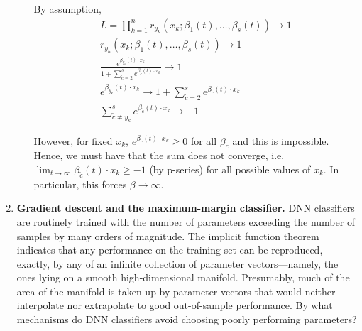 \documentclass[11pt]{report}
\begin{document}
\begin{enumerate}[1.]
\begin{enumerate}[(a)]
		            \color{blue}
		            By assumption,
		            \begin{gather*}
			            L = \prod_{k=1}^n r_{y_k}(x_k; \beta_1(t), \dots, \beta_s(t))  \to 1                                                                          \\
			            r_{y_k}(x_k; \beta_1(t), \dots, \beta_s(t))                    \to 1                                                                          \\
			            \frac{e^{\beta_{y_k}(t) \cdot x_k}}{1 + \sum_{\tilde{c} = 2}^s e^{\beta_{\tilde c}(t) \cdot x_k}} \to 1 \\
			            e^{\beta_{y_k}(t) \cdot x_k} \to 1 + \sum_{\tilde{c} = 2}^s e^{\beta_{\tilde c}(t) \cdot x_k}\\
			            \sum_{\tilde{c} \neq y_k}^s e^{\beta_{\tilde c}(t) \cdot x_k} \to -1
		            \end{gather*}

		            However, for fixed $x_k$, $e^{\beta_{\tilde c}(t) \cdot x_k} \geq 0$ for all $\beta_c$ and this is impossible. Hence, we must have that the sum does not converge, i.e. $\lim_{t \to \infty} \beta_{\tilde c}(t) \cdot x_k \geq -1$ (by p-series) for all possible values of $x_k$. In particular, this forces $\beta \to \infty$.


		            \color{black}


	      \end{enumerate}

	      \pagebreak


	\item {\bf Gradient descent and the maximum-margin classifier.}
	      \label{item:Soudry}
	      DNN classifiers are routinely trained with the number of parameters exceeding the number of samples by many orders of magnitude. The implicit function theorem indicates that any performance on the training set can be reproduced, exactly, by any of an infinite collection of parameter vectors---namely, the ones lying on a smooth high-dimensional manifold. Presumably, much of the area of the manifold is taken up by parameter vectors that would neither interpolate nor extrapolate to good out-of-sample performance. By what mechanisms do DNN classifiers avoid choosing poorly performing parameters?


\end{enumerate}
\end{document}
